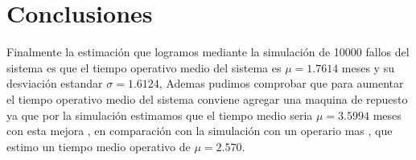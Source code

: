 \documentclass[12pt]{article}
\begin{document}
\section{Conclusiones}
Finalmente la estimación que logramos mediante la simulación de 10000 fallos del sistema es que el tiempo operativo medio del sistema es $\mu=1.7614$  meses y su desviación estandar $\sigma=1.6124$, Ademas pudimos comprobar que para aumentar el tiempo operativo medio del sistema conviene agregar una maquina de repuesto ya que por la simulación estimamos que el tiempo medio seria $\mu=3.5994$ meses con esta mejora , en comparación con la simulación con un operario mas , que estimo un tiempo medio operativo de $\mu=2.570$.
  
\end{document}
